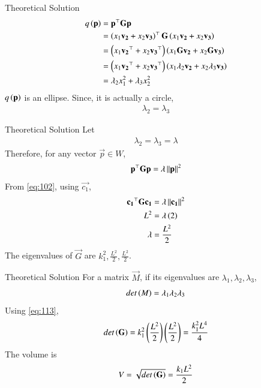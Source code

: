 \documentclass{beamer}
\begin{document}
\begin{frame}{Theoretical Solution}
\begin{align}
	q\left(\mathbf{p}\right) &= \mathbf{p}^\top\mathbf{G}\mathbf{p} \\
	&= \left(x_1\mathbf{v_2}+x_2\mathbf{v_3}\right)^\top\mathbf{G}\left(x_1\mathbf{v_2}+x_2\mathbf{v_3}\right) \\
	&= \left(x_1\mathbf{v_2}^\top+x_2\mathbf{v_3}^\top\right)\left(x_1\mathbf{G}\mathbf{v_2}+x_2\mathbf{G}\mathbf{v_3}\right) \\
	&= \left(x_1\mathbf{v_2}^\top+x_2\mathbf{v_3}^\top\right)\left(x_1\lambda_2\mathbf{v_2}+x_2\lambda_3\mathbf{v_3}\right) \\
	&= \lambda_2 x_1^2+\lambda_3 x_2^2 \\
\end{align}
$q\left(\mathbf{p}\right)$ is an ellipse. Since, it is actually a circle,
\begin{align}
	\lambda_2 = \lambda_3
\end{align}
\end{frame}

\begin{frame}{Theoretical Solution}
Let
\begin{align}
	\lambda_2 = \lambda_3 = \lambda
\end{align}
Therefore, for any vector $\vec{p} \in W$, 
\begin{align}
	\mathbf{p}^\top\mathbf{G}\mathbf{p} = \lambda\left\lVert\mathbf{p}\right\rVert^2 \label{eq:102}
\end{align}
From \eqref{eq:102}, using $\vec{c_1}$,
\begin{align}
    \mathbf{c_1}^\top\mathbf{G}\mathbf{c_1} &= \lambda\left\lVert\mathbf{c_1}\right\rVert^2 \\
    L^2 &= \lambda\left(2\right) \\
    \lambda &= \frac{L^2}{2}
\end{align}
The eigenvalues of $\vec{G}$ are $k_1^2, \frac{L^2}{2}, \frac{L^2}{2}$.
\end{frame}

\begin{frame}{Theoretical Solution}
For a matrix $\vec{M}$, if its eigenvalues are $\lambda_1, \lambda_2, \lambda_3$,
\begin{align}
	det\left(M\right) = \lambda_1\lambda_2\lambda_3 \label{eq:113}
\end{align}
Using \eqref{eq:113},
\begin{align}
    det\left(\mathbf{G}\right) = k_1^2 \left(\frac{L^2}{2}\right) \left(\frac{L^2}{2}\right) = \frac{k_1^2 L^4}{4}
\end{align}
The volume is 
\begin{align}
    V = \sqrt{det\left(\mathbf{G}\right)} = \frac{k_1 L^2}{2}
\end{align}
\end{frame}
\end{document}
